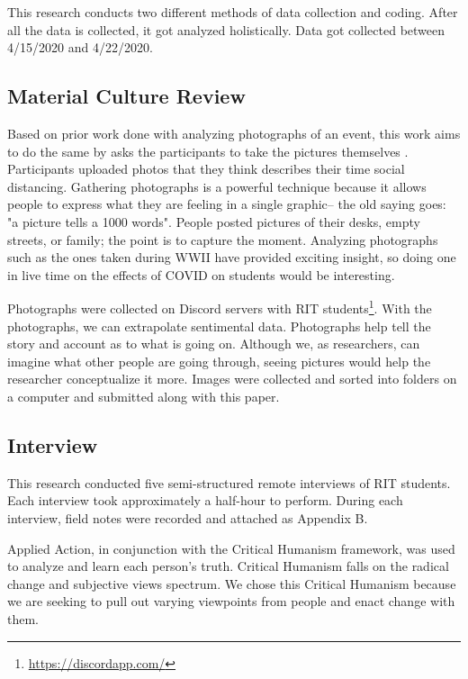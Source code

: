 \documentclass[12pt,
 reprint,
nofootinbib,
 amsmath,amssymb,
 aps,
floatfix,
]{revtex4-2}
\begin{document}
This research conducts two different methods of data collection and coding. After all the data is collected, it got analyzed holistically. Data got collected between 4/15/2020 and 4/22/2020. 

\subsection{Material Culture Review}

Based on prior work done with analyzing photographs of an event, this work aims to do the same by asks the participants to take the pictures themselves \cite{photographyMaterialCulture, generalDocumentAnalysis}. 
Participants uploaded photos that they think describes their time social distancing. Gathering photographs is a powerful technique because it allows people to express what they are feeling in a single graphic-- the old saying goes: "a picture tells a 1000 words". People posted pictures of their desks, empty streets, or family; the point is to capture the moment.
Analyzing photographs such as the ones taken during WWII\cite{wwII} have provided exciting insight, so doing one in live time on the effects of COVID on students would be interesting. 

Photographs were collected on Discord servers with RIT students\footnote{\url{https://discordapp.com/}}. With the photographs, we can extrapolate sentimental data. Photographs help tell the story and account as to what is going on. Although we, as researchers, can imagine what other people are going through, seeing pictures would help the researcher conceptualize it more. Images were collected and sorted into folders on a computer and submitted along with this paper. 

\subsection{Interview}

This research conducted five semi-structured remote interviews of RIT students.
Each interview took approximately a half-hour to perform. During each interview, field notes were recorded and attached as Appendix B. 

Applied Action, in conjunction with the Critical Humanism framework, was used to analyze and learn each person's truth. 
Critical Humanism falls on the radical change and subjective views spectrum. 
We chose this Critical Humanism because we are seeking to pull out varying viewpoints from people and enact change with them.
\end{document}
